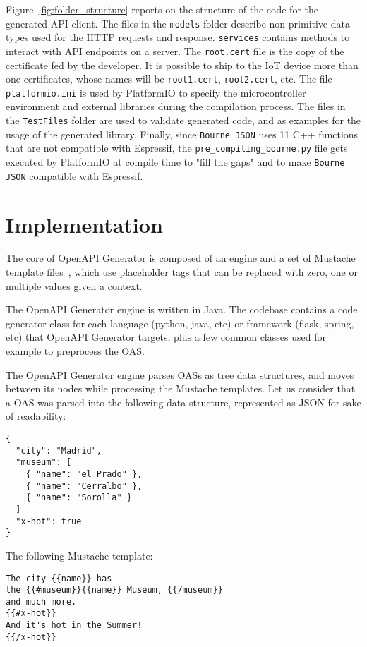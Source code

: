 \documentclass[manuscript,screen]{acmart}
\begin{document}
Figure~\ref{fig:folder_structure} reports on the structure of the code for the generated API client. 
The files in the \texttt{models} folder describe non-primitive data types used for the HTTP requests and response. \texttt{services} contains methods to interact with API endpoints on a server. 
%
The \texttt{root.cert} file is the copy of the certificate fed by the developer. It is possible to ship to the IoT device more than one certificates, whose names will be \texttt{root1.cert}, \texttt{root2.cert}, etc.
%
The file \texttt{platformio.ini} is used by PlatformIO to specify the microcontroller environment and external libraries during the compilation process. 
%
The files in the \texttt{TestFiles} folder are used to validate generated code, and as examples for the usage of the generated library. 
%
Finally, since \texttt{Bourne JSON} uses 11 C++ functions that are not compatible with Espressif, the \texttt{pre\_compiling\_bourne.py} file gets executed by PlatformIO at compile time to "fill the gaps" and to make \texttt{Bourne JSON} compatible with Espressif. 




\section{Implementation}\label{sec:implementation}
The core of OpenAPI Generator is composed of an engine and a set of Mustache template files~\cite{Mustache5}, which use placeholder tags that can be replaced with zero, one or multiple values given a context. 

The OpenAPI Generator engine is written in Java. 
The codebase contains a code generator class for each language (python, java, etc) or framework (flask, spring, etc) that OpenAPI Generator targets, plus a few common classes used for example to preprocess the OAS. 

The OpenAPI Generator engine parses OASs as tree data structures, and moves between its nodes while processing the Mustache templates.
%
Let us consider that a OAS was parsed into the following data structure, represented as JSON for sake of readability:
\begin{verbatim}
{
  "city": "Madrid",
  "museum": [
    { "name": "el Prado" },
    { "name": "Cerralbo" },
    { "name": "Sorolla" }
  ]
  "x-hot": true
}
\end{verbatim}

The following Mustache template:

\begin{verbatim}
The city {{name}} has
the {{#museum}}{{name}} Museum, {{/museum}}
and much more.
{{#x-hot}}
And it's hot in the Summer!
{{/x-hot}}
\end{verbatim}
\end{document}
